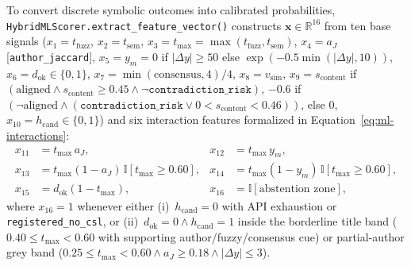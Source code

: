 To convert discrete symbolic outcomes into calibrated probabilities, \texttt{HybridMLScorer.extract\_feature\_vector()} constructs $\mathbf{x} \in \mathbb{R}^{16}$ from ten base signals ($x_1 = t_{\text{fuzz}}$, $x_2 = t_{\text{sem}}$, $x_3 = t_{\max} = \max(t_{\text{fuzz}}, t_{\text{sem}})$, $x_4 = a_J$ [\texttt{author\_jaccard}], $x_5 = y_m = 0$ if $|\Delta y| \ge 50$ else $\exp(-0.5\min(|\Delta y|, 10))$, $x_6 = d_{\text{ok}} \in \{0, 1\}$, $x_7 = \min(\text{consensus}, 4)/4$, $x_8 = v_{\text{sim}}$, $x_9 = s_{\text{content}}$ if $(\text{aligned} \land s_{\text{content}} \ge 0.45 \land \neg\texttt{contradiction\_risk})$, $-0.6$ if $(\neg\text{aligned} \land (\texttt{contradiction\_risk} \lor 0 < s_{\text{content}} < 0.46))$, else $0$, $x_{10} = h_{\text{cand}} \in \{0, 1\}$) and six interaction features formalized in Equation~\eqref{eq:ml-interactions}:
\begin{equation}\label{eq:ml-interactions}
\begin{aligned}
x_{11} &= t_{\max}\, a_J, & x_{12} &= t_{\max}\, y_m, \\
x_{13} &= t_{\max}(1 - a_J)\,\mathbb{I}[t_{\max} \ge 0.60], & x_{14} &= t_{\max}(1 - y_m)\,\mathbb{I}[t_{\max} \ge 0.60], \\
x_{15} &= d_{\text{ok}}(1 - t_{\max}), & x_{16} &= \mathbb{I}[\text{abstention zone}],
\end{aligned}
\end{equation}
where $x_{16} = 1$ whenever either (i)~$h_{\text{cand}} = 0$ with API exhaustion or \texttt{registered\_no\_csl}, or (ii)~$d_{\text{ok}} = 0 \land h_{\text{cand}} = 1$ inside the borderline title band ($0.40 \le t_{\max} < 0.60$ with supporting author/fuzzy/consensus cue) or partial-author grey band ($0.25 \le t_{\max} < 0.60 \land a_J \ge 0.18 \land |\Delta y| \le 3$).

